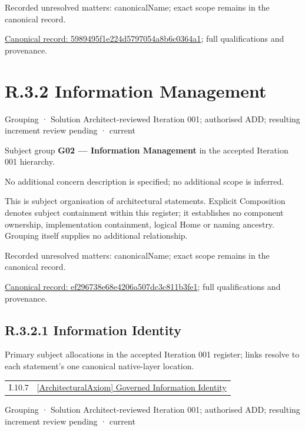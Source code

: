 {\small Recorded unresolved matters: canonicalName; exact scope remains in the canonical record.}\par
{\footnotesize \href{../../../../continuum/grouping/5989495f1e224d5797054a8b6c0364a1.md}{Canonical record: 5989495f1e224d5797054a8b6c0364a1}; full qualifications and provenance.}\par
\section*{R.3.2 Information Management}
\label{navigation:R.3.2}

\label{element:ef296738e68e4206a507dc3c811b3fe1}
{\small Grouping · Solution Architect-reviewed Iteration 001; authorised ADD; resulting increment review pending · current}\par

Subject group \textbf{G02 — Information Management} in the accepted Iteration 001 hierarchy.



No additional concern description is specified; no additional scope is inferred.



This is subject organisation of architectural statements. Explicit Composition denotes subject containment within this register; it establishes no component ownership, implementation containment, logical Home or naming ancestry. Grouping itself supplies no additional relationship.


{\small Recorded unresolved matters: canonicalName; exact scope remains in the canonical record.}\par
{\footnotesize \href{../../../../continuum/grouping/ef296738e68e4206a507dc3c811b3fe1.md}{Canonical record: ef296738e68e4206a507dc3c811b3fe1}; full qualifications and provenance.}\par
\subsection*{R.3.2.1 Information Identity}
\label{navigation:R.3.2.1}

Primary subject allocations in the accepted Iteration 001 register; links resolve to each statement’s one canonical native-layer location.\par
\begin{longtable}{p{.22\linewidth}p{.73\linewidth}}
I.10.7 & \hyperref[element:c2e7ee7597e64275b3523befd72c0987]{[ArchitecturalAxiom] Governed Information Identity} \\
\end{longtable}
\label{element:819aeed91d0544c3b7cc52e69aa46d72}
{\small Grouping · Solution Architect-reviewed Iteration 001; authorised ADD; resulting increment review pending · current}\par

